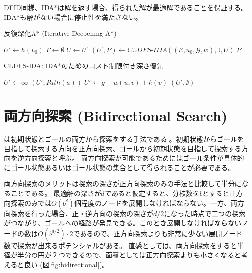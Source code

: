 DFID同様、IDA*は解を返す場合、得られた解が最適解であることを保証する。
IDA*も解がない場合に停止性を満たさない。

\begin{algorithm}
\caption{反復深化A* (Iterative Deepening A*)}
\label{alg:ida}
        $U' \leftarrow h(u_0)$\;
        $P \leftarrow \emptyset$\;
         {
          $U \leftarrow U'$\;
          $(U', P) \leftarrow CLDFS\text{-}IDA((\mathcal{E}, u_0, \mathcal{G}, w), 0, U)$\;
        }
        \Return $P$\;
\end{algorithm}

\begin{algorithm}
\caption{CLDFS-IDA: IDA*のためのコスト制限付き深さ優先}
\label{alg:cldfs-ida}
        $U' \leftarrow \infty$\;
	 {
		\Return $(U', Path(u))$\;
	}
	 {
	   {
             {
              $U' \leftarrow g + w(u, v) + h(v)$\;
            }
     }
	}
	\Return $(U', \emptyset)$\;
\end{algorithm}



\section{両方向探索 (Bidirectional Search)}
\label{sec:bidirectional-search}

は初期状態とゴールの両方から探索をする手法である \cite{pohl1971bi}。初期状態からゴールを目指して探索する方向を正方向探索、ゴールから初期状態を目指して探索する方向を逆方向探索と呼ぶ。
両方向探索が可能であるためにはゴール条件が具体的にゴール状態あるいはゴール状態の集合として得られることが必要である。

両方向探索のメリットは探索の深さが正方向探索のみの手法と比較して半分になることである。
最適解の深さが$d$であると仮定すると、分枝数を$b$とすると正方向探索のみでは$O(b^d)$個程度のノードを展開しなければならない。一方、両方向探索を行った場合、正・逆方向の探索の深さが$d/2$になった時点で二つの探索がつながり、ゴールへの経路が発見できる。このとき展開しなければならないノードの数は$O(b^{d/2}) \cdot 2$であるので、正方向探索よりも非常に少ない展開ノード数で探索が出来るポテンシャルがある。
直感としては、両方向探索をすると半径が半分の円が２つできるので、面積としては正方向探索よりも小さくなると考えると良い (図\ref{fig:bidirectional})。

